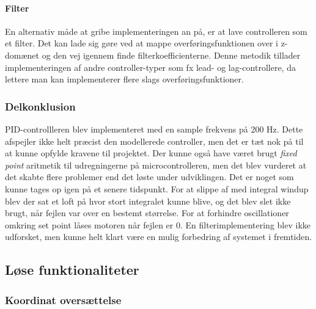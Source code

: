 \paragraph{Filter}
En alternativ måde at gribe implementeringen an på, er at lave controlleren som et filter. Det kan lade sig gøre ved at mappe overføringsfunktionen over i z-domænet og den vej igennem finde filterkoefficienterne. Denne metodik tillader implementeringen af andre controller-typer som fx lead- og lag-controllere, da lettere man kan implementerer flere slags overføringsfunktioner.

\subsubsection{Delkonklusion}

PID-controllleren blev implementeret med en sample frekvens på 200 Hz. Dette afspejler ikke helt præcist den modellerede controller, men det er tæt nok på til at kunne opfylde kravene til projektet. Der kunne også have været brugt \textit{fixed point} aritmetik til udregningerne på microcontrolleren, men det blev vurderet at det skabte flere problemer end det løste under udviklingen. Det er noget som kunne tages op igen på et senere tidspunkt. For at slippe af med integral windup blev der sat et loft på hvor stort integralet kunne blive, og det blev slet ikke brugt, når fejlen var over en bestemt størrelse. For at forhindre oscillationer omkring set point låses motoren når fejlen er 0. En filterimplementering blev ikke udforsket, men kunne helt klart være en mulig forbedring af systemet i fremtiden.

\subsection{Løse funktionaliteter}

\subsubsection{Koordinat oversættelse}

